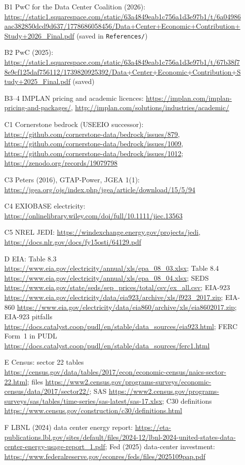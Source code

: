 \documentclass[11pt]{article}
\begin{document}
\begin{itemize}
  \item[B1] PwC for the Data Center Coalition (2026): \url{https://static1.squarespace.com/static/63a4849eab1c756a1d3e97b1/t/6a04986aac382850dcd9d637/1778686058456/Data+Center+Economic+Contribution+Study+2026_Final.pdf} (saved in \texttt{References/})
  \item[B2] PwC (2025): \url{https://static1.squarespace.com/static/63a4849eab1c756a1d3e97b1/t/67b38f78e9cf125daf756112/1739820925392/Data+Center+Economic+Contribution+Study+2025_Final.pdf} (saved)
  \item[B3--4] IMPLAN pricing and academic licences: \url{https://implan.com/implan-pricing-and-packages/}, \url{http://implan.com/solutions/industries/academic/}
  \item[C1] Cornerstone bedrock (USEEIO successor): \url{https://github.com/cornerstone-data/bedrock/issues/879}, \url{https://github.com/cornerstone-data/bedrock/issues/1009}, \url{https://github.com/cornerstone-data/bedrock/issues/1012}; \url{https://zenodo.org/records/19079798}
  \item[C3] Peters (2016), GTAP-Power, JGEA 1(1): \url{https://jgea.org/ojs/index.php/jgea/article/download/15/5/94}
  \item[C4] EXIOBASE electricity: \url{https://onlinelibrary.wiley.com/doi/full/10.1111/jiec.13563}
  \item[C5] NREL JEDI: \url{https://windexchange.energy.gov/projects/jedi}, \url{https://docs.nlr.gov/docs/fy15osti/64129.pdf}
  \item[D] EIA: Table 8.3 \url{https://www.eia.gov/electricity/annual/xls/epa_08_03.xlsx}; Table 8.4 \url{https://www.eia.gov/electricity/annual/xls/epa_08_04.xlsx}; SEDS \url{https://www.eia.gov/state/seds/sep_prices/total/csv/ex_all.csv}; EIA-923 \url{https://www.eia.gov/electricity/data/eia923/archive/xls/f923_2017.zip}; EIA-860 \url{https://www.eia.gov/electricity/data/eia860/archive/xls/eia8602017.zip}; EIA-923 pitfalls \url{https://docs.catalyst.coop/pudl/en/stable/data_sources/eia923.html}; FERC Form~1 in PUDL \url{https://docs.catalyst.coop/pudl/en/stable/data_sources/ferc1.html}
  \item[E] Census: sector 22 tables \url{https://census.gov/data/tables/2017/econ/economic-census/naics-sector-22.html}; files \url{https://www2.census.gov/programs-surveys/economic-census/data/2017/sector22/}; SAS \url{https://www2.census.gov/programs-surveys/sas/tables/time-series/sas-latest/sas-17.xlsx}; C30 definitions \url{https://www.census.gov/construction/c30/definitions.html}
  \item[F] LBNL (2024) data center energy report: \url{https://eta-publications.lbl.gov/sites/default/files/2024-12/lbnl-2024-united-states-data-center-energy-usage-report_1.pdf}; Fed (2025) data-center investment: \url{https://www.federalreserve.gov/econres/feds/files/2025109pap.pdf}
\end{itemize}
\end{document}
